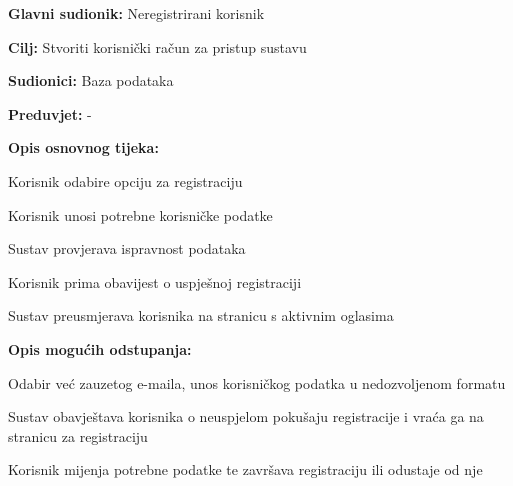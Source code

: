 					\noindent {}
					\begin{packed_item}
	
						\item \textbf{Glavni sudionik: }Neregistrirani korisnik
						\item  \textbf{Cilj: }Stvoriti korisnički račun za pristup sustavu
						\item  \textbf{Sudionici: }Baza podataka
						\item  \textbf{Preduvjet: }-
						\item  \textbf{Opis osnovnog tijeka:}
						
						\item[] \begin{packed_enum}
	
							\item Korisnik odabire opciju za registraciju
							\item  Korisnik unosi potrebne korisničke podatke
							\item  Sustav provjerava ispravnost podataka
							\item  Korisnik prima obavijest o uspješnoj registraciji
							\item  Sustav preusmjerava korisnika na stranicu s aktivnim oglasima

						\end{packed_enum}
						
						\item  \textbf{Opis mogućih odstupanja:}
						
						\item[] \begin{packed_item}
	
							\item[2.a] Odabir već zauzetog e-maila, unos korisničkog podatka u nedozvoljenom formatu
							\item[] \begin{packed_enum}
								
								\item Sustav obavještava korisnika o neuspjelom pokušaju registracije i vraća ga na stranicu za registraciju
								\item Korisnik mijenja potrebne podatke te završava registraciju ili odustaje od nje
								
							\end{packed_enum}
							
						\end{packed_item}						
					\end{packed_item}




